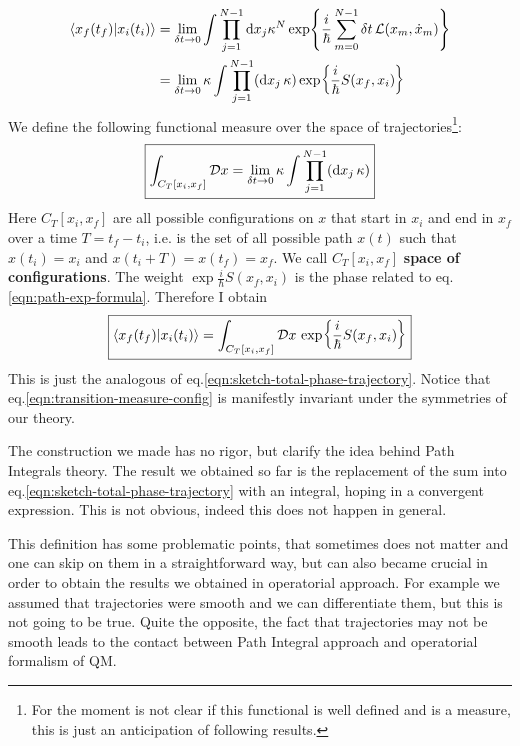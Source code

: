 \documentclass[../main/main.tex]{subfiles}
\begin{document}
\begin{align*}
\braket{x_f(t_f)}{x_i(t_i)}
&=\lim_{\delta t\to0}\int\prod_{j=1}^{N-1}\textup{d} x_j
\kappa^N\exp{\frac{i}{\hbar}\sum_{m=0}^{N-1}\delta t\,\mathcal L(x_m,\dot x_m)}\\
&=\lim_{\delta t\to0}\kappa\int\prod_{j=1}^{N-1}(\textup{d} x_j\, \kappa)\exp{\frac{i}{\hbar}S(x_f,x_i)}
\end{align*}
We define the following functional measure over the space of trajectories\footnote{For the moment is not  clear if this functional is well defined and is a measure, this is just an anticipation of following results.}:
\begin{equation}\boxed{
\int_{C_T[x_i,x_f]} \mathcal Dx = \lim_{\delta t\to0} \kappa \int\prod_{j=1}^{N-1}(\textup{d} x_j\,\kappa)
}\end{equation}
Here $C_T[x_i,x_f]$ are all possible configurations on $x$ that start in $x_i$ and end in $x_f$ over a time $T=t_f-t_i$, i.e. is the set of all possible path $x(t)$ such that $x(t_i)=x_i$ and $x(t_i+T)=x(t_f)=x_f$. We call ${C_T[x_i,x_f]}$ \textbf{space of configurations}. The weight $\exp{\frac{i}{\hbar}S(x_f,x_i)}$ is the phase related to eq.\eqref{eqn:path-exp-formula}. Therefore I obtain
\begin{equation}\label{eqn:transition-measure-config}\boxed{
\braket{x_f(t_f)}{x_i(t_i)}=\int_{C_T[x_i,x_f]} \mathcal Dx\,\exp{\frac{i}{\hbar}S(x_f,x_i)}
}\end{equation}
This is just the analogous of eq.\eqref{eqn:sketch-total-phase-trajectory}. Notice that eq.\eqref{eqn:transition-measure-config} is manifestly invariant under the symmetries of our theory. 

The construction we made has no rigor, but clarify the idea behind Path Integrals theory. The result we obtained so far is the replacement of the sum into eq.\eqref{eqn:sketch-total-phase-trajectory} with an integral, hoping in a convergent expression. This is not obvious, indeed this does not happen in general. 

This definition has some problematic points, that sometimes does not matter and one can skip on them in a straightforward way, but can also became crucial in order to obtain the results we obtained in operatorial approach. For example we assumed that trajectories were smooth and we can differentiate them, but this is not going to be true. Quite the opposite, the fact that trajectories may not be smooth leads to the contact between Path Integral approach and operatorial formalism of QM. 
\end{document}
